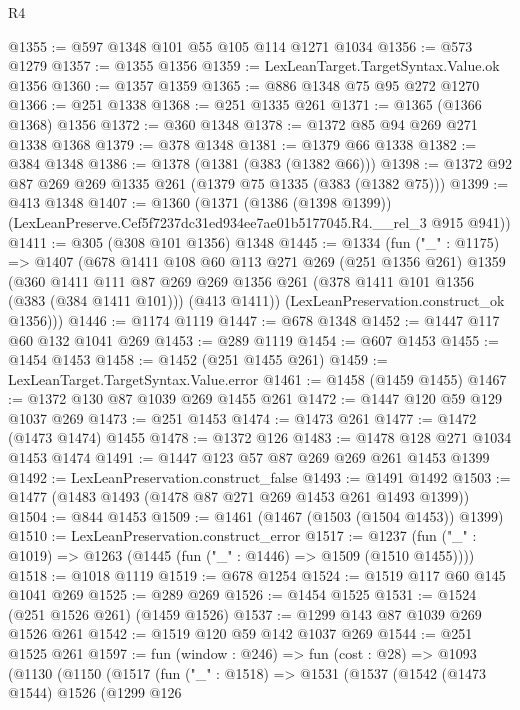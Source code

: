 \begin{lexlean}{R4}
\begin{coremodule}
@1355 := @597 @1348 @101 @55 @105 @114 @1271 @1034
@1356 := @573 @1279
@1357 := @1355 @1356
@1359 := LexLeanTarget.TargetSyntax.Value.ok @1356
@1360 := @1357 @1359
@1365 := @886 @1348 @75 @95 @272 @1270
@1366 := @251 @1338
@1368 := @251 @1335 @261
@1371 := @1365 (@1366 @1368) @1356
@1372 := @360 @1348
@1378 := @1372 @85 @94 @269 @271 @1338 @1368
@1379 := @378 @1348
@1381 := @1379 @66 @1338
@1382 := @384 @1348
@1386 := @1378 (@1381 (@383 (@1382 @66)))
@1398 := @1372 @92 @87 @269 @269 @1335 @261 (@1379 @75 @1335 (@383 (@1382 @75)))
@1399 := @413 @1348
@1407 := @1360
    (@1371
      (@1386 (@1398 @1399))
      (LexLeanPreserve.Cef5f7237dc31ed934ee7ae01b5177045.R4.__rel_3 @915 @941))
@1411 := @305 (@308 @101 @1356) @1348
@1445 := @1334
    (fun ("_" : @1175) =>
    @1407
      (@678
        @1411
        @108
        @60
        @113
        @271
        @269
        (@251 @1356 @261)
        @1359
        (@360
          @1411
          @111
          @87
          @269
          @269
          @1356
          @261
          (@378 @1411 @101 @1356 (@383 (@384 @1411 @101)))
          (@413 @1411))
        (LexLeanPreservation.construct_ok @1356)))
@1446 := @1174 @1119
@1447 := @678 @1348
@1452 := @1447 @117 @60 @132 @1041 @269
@1453 := @289 @1119
@1454 := @607 @1453
@1455 := @1454 @1453
@1458 := @1452 (@251 @1455 @261)
@1459 := LexLeanTarget.TargetSyntax.Value.error
@1461 := @1458 (@1459 @1455)
@1467 := @1372 @130 @87 @1039 @269 @1455 @261
@1472 := @1447 @120 @59 @129 @1037 @269
@1473 := @251 @1453
@1474 := @1473 @261
@1477 := @1472 (@1473 @1474) @1455
@1478 := @1372 @126
@1483 := @1478 @128 @271 @1034 @1453 @1474
@1491 := @1447 @123 @57 @87 @269 @269 @261 @1453 @1399
@1492 := LexLeanPreservation.construct_false
@1493 := @1491 @1492
@1503 := @1477 (@1483 @1493 (@1478 @87 @271 @269 @1453 @261 @1493 @1399))
@1504 := @844 @1453
@1509 := @1461 (@1467 (@1503 (@1504 @1453)) @1399)
@1510 := LexLeanPreservation.construct_error
@1517 := @1237 (fun ("_" : @1019) => @1263 (@1445 (fun ("_" : @1446) => @1509 (@1510 @1455))))
@1518 := @1018 @1119
@1519 := @678 @1254
@1524 := @1519 @117 @60 @145 @1041 @269
@1525 := @289 @269
@1526 := @1454 @1525
@1531 := @1524 (@251 @1526 @261) (@1459 @1526)
@1537 := @1299 @143 @87 @1039 @269 @1526 @261
@1542 := @1519 @120 @59 @142 @1037 @269
@1544 := @251 @1525 @261
@1597 := fun (window : @246) =>
  fun (cost : @28) =>
  @1093
    (@1130
      (@1150
        (@1517
          (fun ("_" : @1518) =>
          @1531
            (@1537
              (@1542
                (@1473 @1544)
                @1526
                (@1299
                  @126

\end{coremodule}
\end{lexlean}
